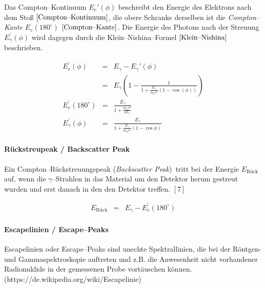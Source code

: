 \documentclass[12pt,a4paper]{scrartcl}
\numberwithin{equation}{section} %
\renewcommand{\[}{} %
\renewcommand{\]}{\noindent} %
\begin{document}
Das Compton--Kontinuum \(E_e'(\phi)\) beschreibt den Energie des
Elektrons nach dem Stoß \(\eqref{Compton--Kontinuum}\), die obere
Schranke derselben ist die \emph{Compton--Kante} \(E_e(180^\circ)\)
\(\eqref{Compton--Kante}\). Die Energie des Photons nach der Streuung
\(E_{\gamma}^\prime(\phi)\) wird dagegen durch die
Klein--Nishina--Formel \(\eqref{Klein--Nishina}\) beschrieben.

\[
\begin{eqnarray}
    E_e^\prime(\phi)
        &=& E_{\gamma} - E_{\gamma}'(\phi) \\
        &=& E_{\gamma}
            \left(
                1-
                \frac{1}{1+\frac{E_{\gamma}}{m_\mathrm ec^2}
                    (1-\cos(\phi))}
            \right) \label{Compton--Kontinuum} \\
    E_e^\prime(180^\circ) &=& \frac{E_\gamma}{1+\frac{m_ec^2}{2E_\gamma}}
        \label{Compton--Kante} \\
    E_{\gamma}^\prime(\phi)
        &=& \frac{E_{\gamma}}{1+\frac{E_{\gamma}}{m_\mathrm ec^2}
            (1-\cos\phi)} \label{Klein--Nishina}
\end{eqnarray}
\]

\hypertarget{ruxfcckstreupeak-backscatter-peak}{%
\paragraph{Rückstreupeak / Backscatter
Peak}\label{ruxfcckstreupeak-backscatter-peak}}

Ein Compton--Rückstreuungspeak (\emph{Backscatter Peak})~tritt bei der
Energie \(E_\mathrm{Rück}\) auf, wenn die \(\gamma\)--Strahlen in das
Material um den Detektor herum gestreut wurden und erst danach in den
den Detektor treffen. \([7]\)

\[
\begin{eqnarray}
    E_\mathrm{Rück} &=& E_\gamma - E_e^\prime(180^\circ)
\end{eqnarray}
\]

\hypertarget{escapelinien-escapepeaks}{%
\paragraph{Escapelinien /
Escape--Peaks}\label{escapelinien-escapepeaks}}

Escapelinien oder Escape--Peaks sind unechte Spektrallinien, die bei der
Röntgen- und Gammaspektroskopie auftreten und z.B. die Anwesenheit nicht
vorhandener Radionuklide in der gemessenen Probe vortäuschen können.
(https://de.wikipedia.org/wiki/Escapelinie)
\end{document}
